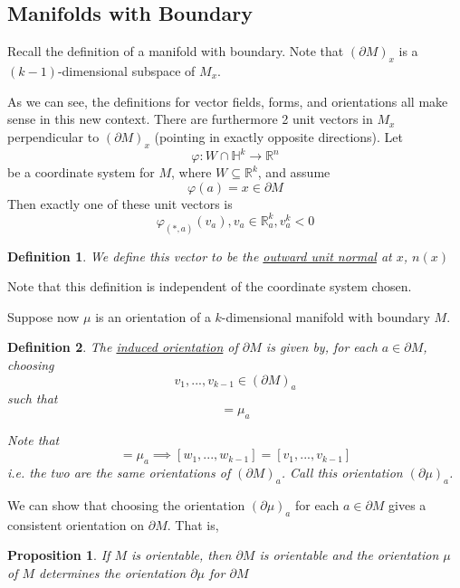 \documentclass{article}
\newtheorem{definition}{Definition}
\newtheorem{proposition}{Proposition}
\newcommand{\reals}[0]{\mathbb{R}}
\newcommand{\hlfspc}[0]{\mathbb{H}}
\begin{document}
\subsection{Manifolds with Boundary}

Recall the definition of a manifold with boundary.  Note that \((\partial M)_x\) is a \((k - 1)\)-dimensional subspace of \(M_x\).

As we can see, the definitions for vector fields, forms, and orientations all make sense in this new context. There are furthermore 2 unit vectors in \(M_x\) perpendicular to \((\partial M)_x\) (pointing in exactly opposite directions). Let
\begin{equation}
  \varphi: W \cap \hlfspc^k \to \reals^n
\end{equation}
be a coordinate system for \(M\), where \(W \subseteq \reals^k\), and assume
\begin{equation}
  \varphi(a) = x \in \partial M
\end{equation}
Then exactly one of these unit vectors is
\begin{equation}
  \varphi_{(*, a)}(v_a), v_a \in \reals^k_a, v_a^k < 0
\end{equation}
\begin{definition}
  We define this vector to be the \underline{outward unit normal} at \(x\), \(n(x)\)
  \label{def:outwardnormal}
\end{definition}
Note that this definition is independent of the coordinate system chosen.

Suppose now \(\mu\) is an orientation of a \(k\)-dimensional manifold with boundary \(M\).
\begin{definition}
  The \underline{induced orientation} of \(\partial M\) is given by, for each \(a \in \partial M\), choosing
  \begin{equation}
    v_1,...,v_{k - 1} \in (\partial M)_a
  \end{equation}
  such that
  \begin{equation}
    [n(a), v_1,...,v_{k - 1}] = \mu_a
  \end{equation}

  Note that
  \begin{equation}
    [n(a), w_1,...,w_{k - 1}] = \mu_a \implies [w_1,...,w_{k - 1}] = [v_1,...,v_{k - 1}]
  \end{equation}
  i.e. the two are the same orientations of \((\partial M)_a\). Call this orientation \((\partial\mu)_a\).
\end{definition}
We can show that choosing the orientation \((\partial\mu)_a\) for each \(a \in \partial M\) gives a consistent orientation on \(\partial M\). That is,
\begin{proposition}
  If \(M\) is orientable, then \(\partial M\) is orientable and the orientation \(\mu\) of \(M\) determines the orientation \(\partial\mu\) for \(\partial M\)
\end{proposition}
\end{document}
